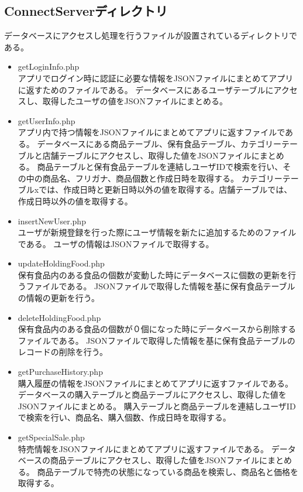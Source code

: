 \documentclass[a4j]{jarticle}
\begin{document}
\subsection{ConnectServerディレクトリ}
データベースにアクセスし処理を行うファイルが設置されているディレクトリである。
\begin{itemize}
\item getLoginInfo.php \\
  アプリでログイン時に認証に必要な情報をJSONファイルにまとめてアプリに返すためのファイルである。
  データベースにあるユーザテーブルにアクセスし、取得したユーザの値をJSONファイルにまとめる。
		\item getUserInfo.php \\
		アプリ内で持つ情報をJSONファイルにまとめてアプリに返すファイルである。
		データベースにある商品テーブル、保有食品テーブル、カテゴリーテーブルと店舗テーブルにアクセスし、取得した値をJSONファイルにまとめる。
		商品テーブルと保有食品テーブルを連結しユーザIDで検索を行い、その中の商品名、フリガナ、商品個数と作成日時を取得する。
		カテゴリーテーブルxでは、作成日時と更新日時以外の値を取得する。店舗テーブルでは、作成日時以外の値を取得する。
		\item insertNewUser.php \\
		ユーザが新規登録を行った際にユーザ情報を新たに追加するためのファイルである。
		ユーザの情報はJSONファイルで取得する。
		\item updateHoldingFood.php \\
		保有食品内のある食品の個数が変動した時にデータベースに個数の更新を行うファイルである。
		JSONファイルで取得した情報を基に保有食品テーブルの情報の更新を行う。
		\item deleteHoldingFood.php \\
		保有食品内のある食品の個数が０個になった時にデータベースから削除するファイルである。
		JSONファイルで取得した情報を基に保有食品テーブルのレコードの削除を行う。
		\item getPurchaseHistory.php \\
		購入履歴の情報をJSONファイルにまとめてアプリに返すファイルである。
		データベースの購入テーブルと商品テーブルにアクセスし、取得した値をJSONファイルにまとめる。
		購入テーブルと商品テーブルを連結しユーザIDで検索を行い、商品名、購入個数、作成日時を取得する。
		\item getSpecialSale.php \\
		特売情報をJSONファイルにまとめてアプリに返すファイルである。
		データベースの商品テーブルにアクセスし、取得した値をJSONファイルにまとめる。
		商品テーブルで特売の状態になっている商品を検索し、商品名と価格を取得する。

\end{itemize}
\end{document}
